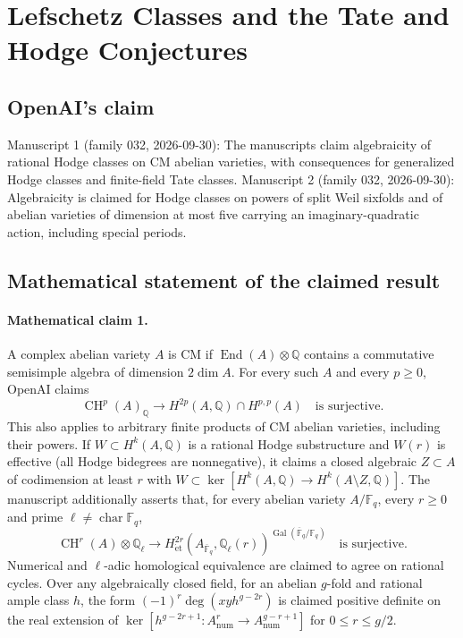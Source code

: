 \documentclass[11pt]{article}
\begin{document}
\section*{Lefschetz Classes and the Tate and Hodge Conjectures}

\subsection{OpenAI's claim}
Manuscript 1 (family 032, 2026-09-30): The manuscripts claim algebraicity of rational Hodge classes on CM abelian varieties, with consequences for generalized Hodge classes and finite-field Tate classes. Manuscript 2 (family 032, 2026-09-30): Algebraicity is claimed for Hodge classes on powers of split Weil sixfolds and of abelian varieties of dimension at most five carrying an imaginary-quadratic action, including special periods.

\subsection{Mathematical statement of the claimed result}
\paragraph{Mathematical claim 1.} A complex abelian variety $A$ is CM if $\operatorname{End}(A)\otimes\mathbb Q$ contains a commutative semisimple algebra of dimension $2\dim A$. For every such $A$ and every $p\ge0$, OpenAI claims
\[
\operatorname{CH}^p(A)_{\mathbb Q}\longrightarrow H^{2p}(A,\mathbb Q)\cap H^{p,p}(A)
\quad\text{is surjective}.
\]
This also applies to arbitrary finite products of CM abelian varieties, including their powers. If $W\subset H^k(A,\mathbb Q)$ is a rational Hodge substructure and $W(r)$ is effective (all Hodge bidegrees are nonnegative), it claims a closed algebraic $Z\subset A$ of codimension at least $r$ with $W\subset\ker[H^k(A,\mathbb Q)\to H^k(A\setminus Z,\mathbb Q)]$.
The manuscript additionally asserts that, for every abelian variety $A/\mathbb F_q$, every $r\ge0$ and prime $\ell\ne\operatorname{char}\mathbb F_q$,
\[
\operatorname{CH}^r(A)\otimes\mathbb Q_\ell\longrightarrow
H^{2r}_{\mathrm{\acute et}}(A_{\overline{\mathbb F}_q},\mathbb Q_\ell(r))^{\operatorname{Gal}(\overline{\mathbb F}_q/\mathbb F_q)}
\quad\text{is surjective}.
\]
Numerical and $\ell$-adic homological equivalence are claimed to agree on rational cycles. Over any algebraically closed field, for an abelian $g$-fold and rational ample class $h$, the form $(-1)^r\deg(xyh^{g-2r})$ is claimed positive definite on the real extension of $\ker[h^{g-2r+1}:A^r_{\mathrm{num}}\to A^{g-r+1}_{\mathrm{num}}]$ for $0\le r\le g/2$.
\end{document}
